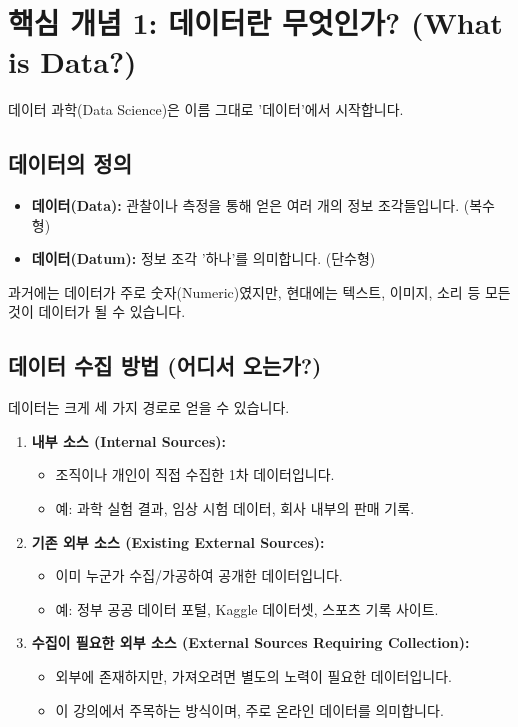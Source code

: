 \documentclass[11pt,a4paper]{book}
\theoremstyle{definition}
\begin{document}
\section{핵심 개념 1: 데이터란 무엇인가? (What is Data?)}

데이터 과학(Data Science)은 이름 그대로 '데이터'에서 시작합니다.

\subsection{데이터의 정의}

\begin{itemize}
    \item \textbf{데이터(Data):} 관찰이나 측정을 통해 얻은 여러 개의 정보 조각들입니다. (복수형)
    \item \textbf{데이터(Datum):} 정보 조각 '하나'를 의미합니다. (단수형)
\end{itemize}

과거에는 데이터가 주로 숫자(Numeric)였지만, 현대에는 텍스트, 이미지, 소리 등 모든 것이 데이터가 될 수 있습니다.

\subsection{데이터 수집 방법 (어디서 오는가?)}

데이터는 크게 세 가지 경로로 얻을 수 있습니다.

\begin{enumerate}
    \item \textbf{내부 소스 (Internal Sources):}
    \begin{itemize}
        \item 조직이나 개인이 직접 수집한 1차 데이터입니다.
        \item 예: 과학 실험 결과, 임상 시험 데이터, 회사 내부의 판매 기록.
    \end{itemize}

    \item \textbf{기존 외부 소스 (Existing External Sources):}
    \begin{itemize}
        \item 이미 누군가 수집/가공하여 공개한 데이터입니다.
        \item 예: 정부 공공 데이터 포털, Kaggle 데이터셋, 스포츠 기록 사이트.
    \end{itemize}

    \item \textbf{수집이 필요한 외부 소스 (External Sources Requiring Collection):}
    \begin{itemize}
        \item 외부에 존재하지만, 가져오려면 별도의 노력이 필요한 데이터입니다.
        \item 이 강의에서 주목하는 방식이며, 주로 온라인 데이터를 의미합니다.
    \end{itemize}
\end{enumerate}
\end{document}
